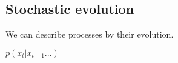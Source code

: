 \subsection{Stochastic evolution}

We can describe processes by their evolution.

\(p(x_t|x_{t-1}...)\)

